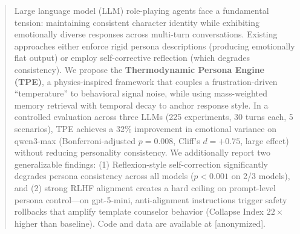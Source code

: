 \begin{abstract}
Large language model (LLM) role-playing agents face a fundamental tension: maintaining consistent character identity while exhibiting emotionally diverse responses across multi-turn conversations. Existing approaches either enforce rigid persona descriptions (producing emotionally flat output) or employ self-corrective reflection (which degrades consistency). We propose the \textbf{Thermodynamic Persona Engine (TPE)}, a physics-inspired framework that couples a frustration-driven ``temperature'' to behavioral signal noise, while using mass-weighted memory retrieval with temporal decay to anchor response style. In a controlled evaluation across three LLMs (225 experiments, 30 turns each, 5 scenarios), TPE achieves a 32\% improvement in emotional variance on qwen3-max (Bonferroni-adjusted $p = 0.008$, Cliff's $d = +0.75$, large effect) without reducing personality consistency. We additionally report two generalizable findings: (1) Reflexion-style self-correction significantly degrades persona consistency across all models ($p < 0.001$ on 2/3 models), and (2) strong RLHF alignment creates a hard ceiling on prompt-level persona control---on gpt-5-mini, anti-alignment instructions trigger safety rollbacks that amplify template counselor behavior (Collapse Index $22\times$ higher than baseline). Code and data are available at [anonymized].
\end{abstract}
